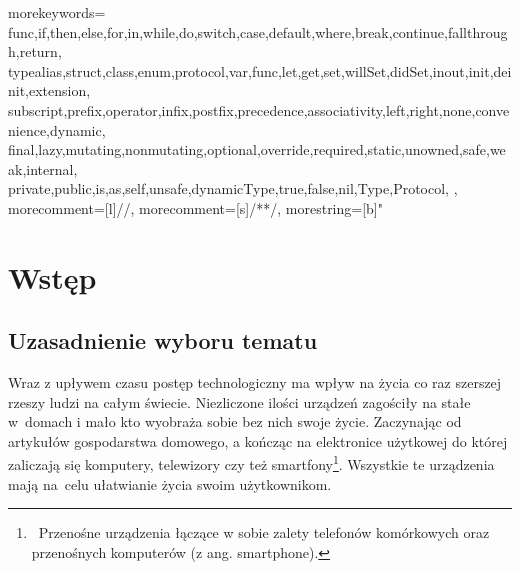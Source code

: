 \documentclass[12pt]{report}
\begin{document}
{
  morekeywords={
    func,if,then,else,for,in,while,do,switch,case,default,where,break,continue,fallthrough,return,
    typealias,struct,class,enum,protocol,var,func,let,get,set,willSet,didSet,inout,init,deinit,extension,
    subscript,prefix,operator,infix,postfix,precedence,associativity,left,right,none,convenience,dynamic,
    final,lazy,mutating,nonmutating,optional,override,required,static,unowned,safe,weak,internal,
    private,public,is,as,self,unsafe,dynamicType,true,false,nil,Type,Protocol,
  },
  morecomment=[l]{//},
  morecomment=[s]{/*}{*/},
  morestring=[b]"
}






\mbox{}
\thispagestyle{empty}
\newpage
\setcounter{page}{1}
\tableofcontents

\chapter{Wstęp}

\section{Uzasadnienie wyboru tematu}

Wraz z upływem czasu postęp technologiczny ma wpływ na życia co raz szerszej rzeszy ludzi na całym świecie. Niezliczone ilości urządzeń zagościły na stałe w~domach i mało kto wyobraża sobie bez nich swoje życie. Zaczynając od artykułów gospodarstwa domowego, a kończąc na elektronice użytkowej do której zaliczają się komputery, telewizory czy też smartfony\footnote{~Przenośne urządzenia łączące w sobie zalety telefonów komórkowych oraz przenośnych komputerów (z ang. smartphone).}. Wszystkie te urządzenia mają na~celu ułatwianie życia swoim użytkownikom.
\end{document}
